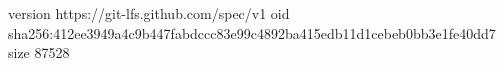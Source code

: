version https://git-lfs.github.com/spec/v1
oid sha256:412ee3949a4c9b447fabdccc83e99c4892ba415edb11d1cebeb0bb3e1fe40dd7
size 87528
